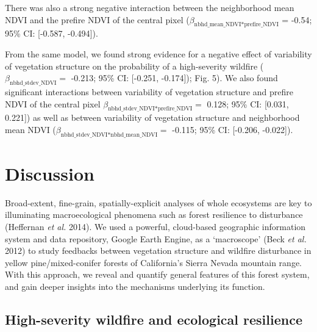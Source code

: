 \documentclass[]{article}
\begin{document}
There was also a strong negative interaction between the neighborhood
mean NDVI and the prefire NDVI of the central pixel
(\(\beta_{\text{nbhd\_mean\_NDVI*prefire\_NDVI}}\) = -0.54; 95\% CI:
{[}-0.587, -0.494{]}).

From the same model, we found strong evidence for a negative effect of
variability of vegetation structure on the probability of a
high-severity wildfire (\(\beta_{\text{nbhd\_stdev\_NDVI}}=\) -0.213;
95\% CI: {[}-0.251, -0.174{]}); Fig. 5). We also found significant
interactions between variability of vegetation structure and prefire
NDVI of the central pixel
\(\beta_{\text{nbhd\_stdev\_NDVI*prefire\_NDVI}}=\) 0.128; 95\% CI:
{[}0.031, 0.221{]}) as well as between variability of vegetation
structure and neighborhood mean NDVI
(\(\beta_{\text{nbhd\_stdev\_NDVI*nbhd\_mean\_NDVI}}=\) -0.115; 95\% CI:
{[}-0.206, -0.022{]}).

\hypertarget{discussion}{%
\section{Discussion}\label{discussion}}

Broad-extent, fine-grain, spatially-explicit analyses of whole
ecosystems are key to illuminating macroecological phenomena such as
forest resilience to disturbance (Heffernan \emph{et al.} 2014). We used
a powerful, cloud-based geographic information system and data
repository, Google Earth Engine, as a `macroscope' (Beck \emph{et al.}
2012) to study feedbacks between vegetation structure and wildfire
disturbance in yellow pine/mixed-conifer forests of California's Sierra
Nevada mountain range. With this approach, we reveal and quantify
general features of this forest system, and gain deeper insights into
the mechanisms underlying its function.

\hypertarget{high-severity-wildfire-and-ecological-resilience}{%
\subsection{High-severity wildfire and ecological
resilience}\label{high-severity-wildfire-and-ecological-resilience}}
\end{document}
